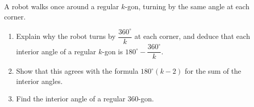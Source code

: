 A robot walks once around a regular $k$-gon, turning by the same angle at each corner.
\begin{enumerate}
\item[(a)] Explain why the robot turns by $\dfrac{360^\circ}{k}$ at each corner, and deduce that each interior angle of a regular $k$-gon is $180^\circ-\dfrac{360^\circ}{k}$.
\item[(b)] Show that this agrees with the formula $180^\circ(k-2)$ for the sum of the interior angles.
\item[(c)] Find the interior angle of a regular $360$-gon.
\end{enumerate}
